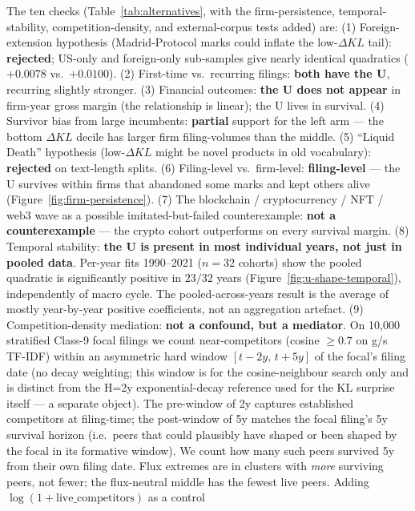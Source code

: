 \documentclass[11pt]{article}
\begin{document}
The ten checks (Table~\ref{tab:alternatives}, with the
firm-persistence, temporal-stability, competition-density, and
external-corpus tests added) are:
(1) Foreign-extension hypothesis (Madrid-Protocol marks could inflate
the low-$\Delta KL$ tail): \textbf{rejected}; US-only and
foreign-only sub-samples give nearly identical quadratics
($+0.0078$ vs.\ $+0.0100$).
(2) First-time vs.\ recurring filings: \textbf{both have the U},
recurring slightly stronger.
(3) Financial outcomes: \textbf{the U does not appear} in firm-year
gross margin (the relationship is linear); the U lives in survival.
(4) Survivor bias from large incumbents: \textbf{partial} support
for the left arm --- the bottom $\Delta KL$ decile has larger firm
filing-volumes than the middle.
(5) ``Liquid Death'' hypothesis (low-$\Delta KL$ might be novel
products in old vocabulary): \textbf{rejected} on text-length
splits.
(6) Filing-level vs.\ firm-level: \textbf{filing-level} --- the U
survives within firms that abandoned some marks and kept others
alive (Figure~\ref{fig:firm-persistence}).
(7) The blockchain / cryptocurrency / NFT / web3 wave as a possible
imitated-but-failed counterexample: \textbf{not a counterexample}
--- the crypto cohort outperforms on every survival margin.
(8) Temporal stability: \textbf{the U is present in most individual
years, not just in pooled data}. Per-year fits 1990--2021 ($n = 32$
cohorts) show the pooled quadratic is significantly positive in
$23 / 32$ years (Figure~\ref{fig:u-shape-temporal}), independently of
macro cycle. The pooled-across-years result is the average of mostly
year-by-year positive coefficients, not an aggregation artefact.
(9) Competition-density mediation: \textbf{not a confound, but a
mediator}. On 10{,}000 stratified Class-9 focal filings we count
near-competitors (cosine $\geq 0.7$ on g/s TF-IDF) within an
asymmetric hard window $[t-2y,\, t+5y]$ of the focal's filing date
(no decay weighting; this window is for the cosine-neighbour search
only and is distinct from the H=2y exponential-decay reference used
for the KL surprise itself --- a separate object). The pre-window of
2y captures established competitors at filing-time; the post-window
of 5y matches the focal filing's 5y survival horizon (i.e.\ peers
that could plausibly have shaped or been shaped by the focal in its
formative window). We count how many such peers survived 5y from
their own filing date. Flux extremes are in clusters with \emph{more}
surviving peers, not fewer; the flux-neutral middle has the fewest
live peers. Adding $\log(1 + \text{live\_competitors})$ as a control
\end{document}
